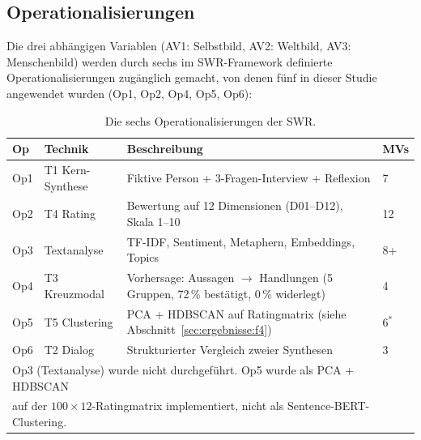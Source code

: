 \documentclass[12pt,a4paper]{article}
\begin{document}
\subsection{Operationalisierungen}
\label{sec:methodik:ops}

Die drei abh\"angigen Variablen (AV1: Selbstbild, AV2: Weltbild, AV3: Menschenbild) werden durch sechs im SWR-Framework definierte Operationalisierungen zug\"anglich gemacht, von denen f\"unf in dieser Studie angewendet wurden (Op1, Op2, Op4, Op5, Op6):

\begin{table}[htbp]
  \centering
  \caption{Die sechs Operationalisierungen der SWR.}
  \label{tab:ops}
  \small
  \begin{tabularx}{\textwidth}{l l X l}
    \toprule
    \textbf{Op} & \textbf{Technik} & \textbf{Beschreibung} & \textbf{MVs} \\
    \midrule
    Op1 & T1 Kern-Synthese & Fiktive Person + 3-Fragen-Interview + Reflexion & 7 \\
    Op2 & T4 Rating & Bewertung auf 12 Dimensionen (D01--D12), Skala 1--10 & 12 \\
    Op3 & Textanalyse & TF-IDF, Sentiment, Metaphern, Embeddings, Topics & 8+ \\
    Op4 & T3 Kreuzmodal & Vorhersage: Aussagen $\to$ Handlungen (5 Gruppen, 72\,\% best\"atigt, 0\,\% widerlegt) & 4 \\
    Op5 & T5 Clustering & PCA + HDBSCAN auf Ratingmatrix (siehe Abschnitt~\ref{sec:ergebnisse:f4}) & 6$^*$ \\
    Op6 & T2 Dialog & Strukturierter Vergleich zweier Synthesen & 3 \\
    \bottomrule
    \multicolumn{4}{l}{\footnotesize Op3 (Textanalyse) wurde nicht durchgef\"uhrt. Op5 wurde als PCA + HDBSCAN}\\
    \multicolumn{4}{l}{\footnotesize auf der $100 \times 12$-Ratingmatrix implementiert, nicht als Sentence-BERT-Clustering.}\\
  \end{tabularx}
\end{table}
\end{document}
